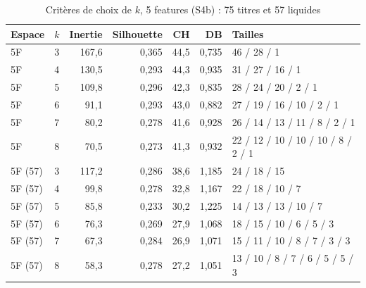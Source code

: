 \begin{table}[H]\centering\small
\caption{Critères de choix de $k$, 5 features (S4b) : 75 titres et 57 liquides}\label{tab:annexe-k5f}
\begin{tabular}{llrrrrl}\toprule
Espace & $k$ & Inertie & Silhouette & CH & DB & Tailles \\ \midrule
5F & 3 & 167{,}6 & 0{,}365 & 44{,}5 & 0{,}735 & 46 / 28 / 1 \\
5F & 4 & 130{,}5 & 0{,}293 & 44{,}3 & 0{,}935 & 31 / 27 / 16 / 1 \\
5F & 5 & 109{,}8 & 0{,}296 & 42{,}3 & 0{,}835 & 28 / 24 / 20 / 2 / 1 \\
5F & 6 & 91{,}1 & 0{,}293 & 43{,}0 & 0{,}882 & 27 / 19 / 16 / 10 / 2 / 1 \\
5F & 7 & 80{,}2 & 0{,}278 & 41{,}6 & 0{,}928 & 26 / 14 / 13 / 11 / 8 / 2 / 1 \\
5F & 8 & 70{,}5 & 0{,}273 & 41{,}3 & 0{,}932 & 22 / 12 / 10 / 10 / 10 / 8 / 2 / 1 \\
\midrule
5F (57) & 3 & 117{,}2 & 0{,}286 & 38{,}6 & 1{,}185 & 24 / 18 / 15 \\
5F (57) & 4 & 99{,}8 & 0{,}278 & 32{,}8 & 1{,}167 & 22 / 18 / 10 / 7 \\
5F (57) & 5 & 85{,}8 & 0{,}233 & 30{,}2 & 1{,}225 & 14 / 13 / 13 / 10 / 7 \\
5F (57) & 6 & 76{,}3 & 0{,}269 & 27{,}9 & 1{,}068 & 18 / 15 / 10 / 6 / 5 / 3 \\
5F (57) & 7 & 67{,}3 & 0{,}284 & 26{,}9 & 1{,}071 & 15 / 11 / 10 / 8 / 7 / 3 / 3 \\
5F (57) & 8 & 58{,}3 & 0{,}278 & 27{,}2 & 1{,}051 & 13 / 10 / 8 / 7 / 6 / 5 / 5 / 3 \\
\bottomrule\end{tabular}\end{table}